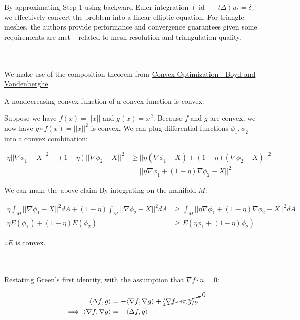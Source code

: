\documentclass{article}
\def\grad{\nabla}
\def\lap{\Delta}
\def\nt{\notag}
\DeclareMathOperator{\id}{id}
\begin{document}
By approximating Step 1 using backward Euler integration $(\id \,-\, t\Delta)u_t = \delta_x$ we effectively convert the problem into a
linear elliptic equation. For triangle meshes, the authors provide performance and convergence guarantees given some requirements are met --
related to mesh resolution and triangulation quality.


\vspace{1.8cm}
\\\\


We make use of the composition theorem from \href{https://web.stanford.edu/~boyd/cvxbook/}{Convex Optimization - Boyd and Vandenberghe}.\\

\begin{mdframed}
    A nondecreasing convex function of a convex function is convex.
\end{mdframed}

Suppose we have $f(x) = ||x||$ and $g(x) = x^2$. Because $f$ and $g$ are convex, we now have
$g \circ f(x) = ||x||^2$ is convex. We can plug differential functions $\phi_1, \phi_2$ into a convex combination:

\begin{align*}
    \eta || \grad \phi_1 - X ||^2 + (1 - \eta) || \grad \phi_2 - X ||^2 &\ge || \eta (\grad \phi_1 - X) + (1 - \eta) (\grad \phi_2 - X) ||^2 \\
        &= || \eta \grad \phi_1 + (1 - \eta) \grad \phi_2 - X ||^2 
\end{align*}

We can make the above claim By integrating on the manifold $M$:

\begin{align*}
    \eta \int_M || \grad \phi_1 - X ||^2 dA + (1 - \eta) \int_M || \grad \phi_2 - X ||^2 dA &\ge \int_M || \eta \grad \phi_1 + (1 - \eta) \grad \phi_2 - X ||^2 dA \\
    \eta E(\phi_1) + (1 - \eta)E(\phi_2) &\ge E(\eta\phi_1 + (1 - \eta)\phi_2)
\end{align*}

$\therefore E$ is convex.


\pagebreak
{}\\\\


Restating Green's first identity, with the assumption that $\grad f \cdot n = 0$:

\begin{align}
    \langle \lap f, g \rangle &= -\langle \grad f, \grad g \rangle + \cancelto{0}{\langle \grad f \cdot n, g \rangle_\partial} \nt\\
    \implies \langle \grad f, \grad g \rangle &= - \langle \lap f, g \rangle
\end{align}
\end{document}

